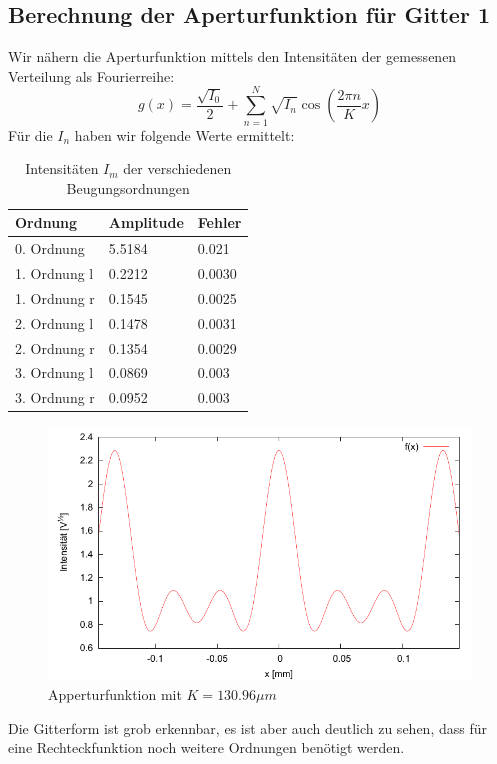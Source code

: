 \subsection{Berechnung der Aperturfunktion f\"ur Gitter 1}

Wir nähern die Aperturfunktion mittels den Intensit\"aten der gemessenen Verteilung als Fourierreihe:
$$g(x) = \frac{\sqrt{I_0}}{2} + \sum_{n=1}^N \sqrt{I_n}\cos\left(\frac{2\pi n}{K}x \right)$$
F\"ur die $I_n$ haben wir folgende Werte ermittelt:

\begin{table}[H]
\centering
\begin{tabular}{lll}
 \toprule
Ordnung & Amplitude & Fehler \\
\midrule
0. Ordnung   & 5.5184 & 0.021 \\
1. Ordnung l & 0.2212 & 0.0030 \\
1. Ordnung r & 0.1545 & 0.0025 \\
2. Ordnung l & 0.1478 & 0.0031 \\
2. Ordnung r & 0.1354 & 0.0029 \\
3. Ordnung l & 0.0869 & 0.003 \\
3. Ordnung r & 0.0952 & 0.003 \\
\bottomrule
\end{tabular}
\caption{Intensitäten $I_m$ der verschiedenen Beugungsordnungen}
\end{table}


\begin{figure}[H]
 \includegraphics{Bilder/appertur.pdf}
\caption{Apperturfunktion mit $K = 130.96 \mu m $}
\end{figure}
Die Gitterform ist grob erkennbar, es ist aber auch deutlich zu sehen, dass für eine Rechteckfunktion noch weitere Ordnungen benötigt werden.


